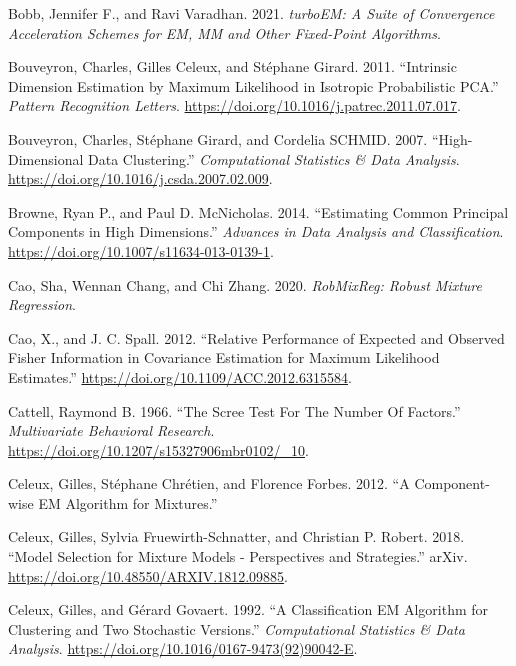 \begin{CSLReferences}{1}{0}
\leavevmode{}%
Bobb, Jennifer F., and Ravi Varadhan. 2021. \emph{turboEM: A Suite of Convergence Acceleration Schemes for EM, MM and Other Fixed-Point Algorithms}.

\leavevmode{}%
Bouveyron, Charles, Gilles Celeux, and Stéphane Girard. 2011. {``Intrinsic {Dimension Estimation} by {Maximum Likelihood} in {Isotropic Probabilistic PCA}.''} \emph{Pattern Recognition Letters}. \url{https://doi.org/10.1016/j.patrec.2011.07.017}.

\leavevmode{}%
Bouveyron, Charles, Stéphane Girard, and Cordelia SCHMID. 2007. {``High-{Dimensional} {Data} {Clustering}.''} \emph{Computational Statistics \& Data Analysis}. \url{https://doi.org/10.1016/j.csda.2007.02.009}.

\leavevmode{}%
Browne, Ryan P., and Paul D. McNicholas. 2014. {``Estimating Common Principal Components in High Dimensions.''} \emph{Advances in Data Analysis and Classification}. \url{https://doi.org/10.1007/s11634-013-0139-1}.

\leavevmode{}%
Cao, Sha, Wennan Chang, and Chi Zhang. 2020. \emph{RobMixReg: Robust Mixture Regression}.

\leavevmode{}%
Cao, X., and J. C. Spall. 2012. {``Relative Performance of Expected and Observed Fisher Information in Covariance Estimation for Maximum Likelihood Estimates.''} \url{https://doi.org/10.1109/ACC.2012.6315584}.

\leavevmode{}%
Cattell, Raymond B. 1966. {``The {Scree} {Test} {For} {The} {Number} {Of} {Factors}.''} \emph{Multivariate Behavioral Research}. \url{https://doi.org/10.1207/s15327906mbr0102/_10}.

\leavevmode{}%
Celeux, Gilles, Stéphane Chrétien, and Florence Forbes. 2012. {``A {Component-wise EM Algorithm} for {Mixtures}.''}

\leavevmode{}%
Celeux, Gilles, Sylvia Fruewirth-Schnatter, and Christian P. Robert. 2018. {``Model Selection for Mixture Models - Perspectives and Strategies.''} arXiv. \url{https://doi.org/10.48550/ARXIV.1812.09885}.

\leavevmode{}%
Celeux, Gilles, and Gérard Govaert. 1992. {``A Classification {EM} Algorithm for Clustering and Two Stochastic Versions.''} \emph{Computational Statistics \& Data Analysis}. \url{https://doi.org/10.1016/0167-9473(92)90042-E}.


\end{CSLReferences}
